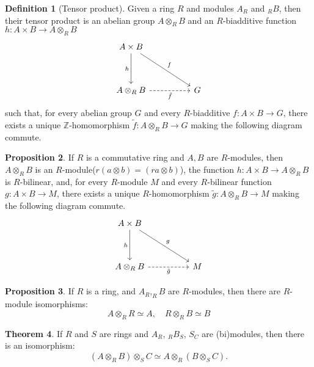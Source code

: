 \documentclass[a4paper,12pt]{article}
\theoremstyle{definition}
\newtheorem{defn}{Definition}[subsection]
\newtheorem{theo}[defn]{Theorem}
\newtheorem{prop}[defn]{Proposition}
\begin{document}
\begin{defn}[Tensor product]
    Given a ring $R$ and modules $A_R$ and ${ }_R B$, then their tensor product is an abelian group $A \otimes_R B$ and an $R$-biadditive function
    $h: A \times B \rightarrow A \otimes_R B$
    \begin{equation*}
        \begin{tikzcd}
            {A\times B } \\
            \\
            {A\otimes_R B} && G
            \arrow["f", from=1-1, to=3-3]
            \arrow["h"', from=1-1, to=3-1]
            \arrow["{\tilde{f}}"', dashed, from=3-1, to=3-3]
        \end{tikzcd}
    \end{equation*}
    such that, for every abelian group $G$ and every $R$-biadditive $f: A \times B \rightarrow G$, there exists a unique $\mathbb{Z}$-homomorphism $\tilde{f}: A \otimes_R B \rightarrow G$ making the following diagram commute.
\end{defn}
\begin{prop}
    If $R$ is a commutative ring and $A, B$ are $R$-modules, then $A \otimes_R B$ is an $R$-module($r(a\otimes b)=(ra\otimes b)$), the function $h: A \times B \rightarrow A \otimes_R B$ is $R$-bilinear, and, for every $R$-module $M$ and every $R$-bilinear function $g: A \times B \rightarrow M$, there exists a unique $R$-homomorphism $\tilde{g}: A \otimes_R B \rightarrow M$ making the following diagram commute.
    \begin{equation*}
        \begin{tikzcd}
            {A\times B } \\
            \\
            {A\otimes_R B} && M
            \arrow["g", from=1-1, to=3-3]
            \arrow["h"', from=1-1, to=3-1]
            \arrow["{\tilde{g}}"', dashed, from=3-1, to=3-3]
        \end{tikzcd}
    \end{equation*}
\end{prop}
\begin{prop}
    If $R$ is a ring, and $A_R,_{R}B$ are $R$-modules, then
    there are $R$-module isomorphisms:
    \begin{equation*}
        A\otimes_R R\simeq A,\quad R\otimes_{R}B\simeq B
    \end{equation*}
    \label{proposition:M otimes R=R}
\end{prop}
\begin{theo}
    If $R$ and $S$ are rings and $A_R$, $_RB_S$, $S_C$ are (bi)modules, then there is an
    isomorphism:
    \begin{equation*}
        (A \otimes_R B) \otimes_S C \simeq  A \otimes_R( B \otimes_S C).
    \end{equation*}
\end{theo}
\end{document}
